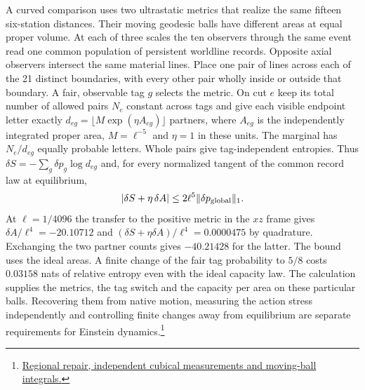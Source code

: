 \documentclass[11pt]{article}
\begin{document}
A curved comparison uses two ultrastatic metrics that realize the
same fifteen six-station distances. Their moving geodesic balls have
different areas at equal proper volume. At each of three scales
the ten observers through the same event read one common population
of persistent worldline records. Opposite axial observers intersect
the same material lines. Place one pair of lines across each of the
21 distinct boundaries, with every other pair wholly inside or outside
that boundary. A fair, observable tag $g$ selects the metric. On cut
$e$ keep its total number of allowed pairs $N_e$ constant across tags
and give each visible endpoint letter exactly
$d_{eg}=\lfloor M\exp(\eta A_{eg})\rfloor$ partners, where $A_{eg}$
is the independently integrated proper area, $M=\ell^{-5}$ and
$\eta=1$ in these units. The marginal has $N_e/d_{eg}$ equally
probable letters. Whole pairs give tag-independent entropies. Thus
$\delta S=-\sum_g\delta p_g\log d_{eg}$ and, for every normalized
tangent of the common record law at equilibrium,
\[
 |\delta S+\eta\,\delta A|\le 2\ell^5\|\delta p_{\rm global}\|_1 .
\]
At $\ell=1/4096$ the transfer to the positive metric in the
$xz$ frame gives $\delta A/\ell^4=-20.10712$ and
$(\delta S+\eta\delta A)/\ell^4=0.0000475$ by quadrature.
Exchanging the two partner counts gives $-40.21428$ for the latter.
The bound uses the ideal areas. A finite change of the fair tag
probability to $5/8$ costs $0.03158$ nats of relative entropy even
with the ideal capacity law. The calculation supplies the metrics,
the tag switch and the capacity per area on these particular balls.
Recovering them from native motion, measuring the action stress
independently and controlling finite changes away from equilibrium
are separate requirements for Einstein dynamics.\footnote{\href{https://github.com/FloatingPragma/observer-patch-holography/tree/main/model/candidate_laws/interval_echo_partition_repair}{Regional repair, independent cubical measurements and moving-ball integrals.}}
\end{document}
